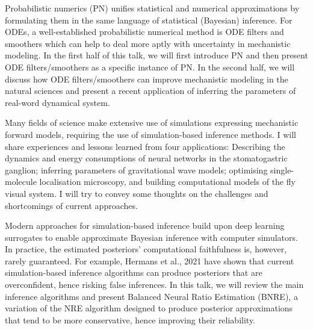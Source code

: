\license

Probabilistic numerics (PN) unifies statistical and numerical approximations by formulating them in the same language of statistical (Bayesian) inference. For ODEs, a well-established probabilistic numerical method is ODE filters and smoothers which can help to deal more aptly with uncertainty in mechanistic modeling. In the first half of this talk, we will first introduce PN and then present ODE filters/smoothers as a specific instance of PN. In the second half, we will discuss how ODE filters/smoothers can improve mechanistic modeling in the natural sciences and present a recent application of inferring the parameters of real-word dynamical system.

\license

Many fields of science make extensive use of simulations expressing mechanistic forward models, requiring the use of simulation-based inference methods. I will share experiences and lessons learned from four applications: Describing the dynamics and energy consumptions of neural networks in the stomatogastric ganglion; inferring parameters of gravitational wave models; optimising single-molecule localisation microscopy, and building computational models of the fly visual system. I will try to convey some thoughts on the challenges and shortcomings of current approaches.

\license

Modern approaches for simulation-based inference build upon deep learning surrogates to enable approximate Bayesian inference with computer simulators. In practice, the estimated posteriors' computational faithfulness is, however, rarely guaranteed. For example, Hermans et al., 2021 have shown that current simulation-based inference algorithms can produce posteriors that are overconfident, hence risking false inferences. In this talk, we will review the main inference algorithms and present Balanced Neural Ratio Estimation (BNRE), a variation of the NRE algorithm designed to produce posterior approximations that tend to be more conservative, hence improving their reliability.

